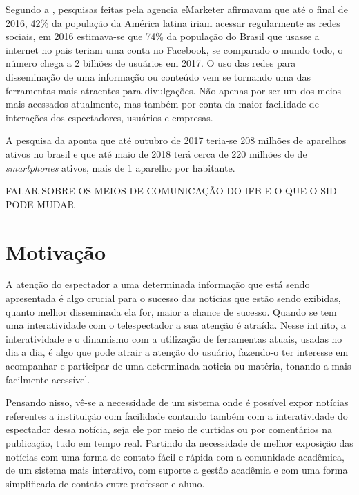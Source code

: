 
Segundo a \cite{forbes2016}, pesquisas feitas pela agencia eMarketer afirmavam que até o final de 2016, 42\% da população da América latina iriam acessar regularmente as redes sociais, em 2016 estimava-se que 74\% da população do Brasil que usasse a internet no pais teriam uma conta no Facebook, se comparado o mundo todo, o número chega a 2 bilhões de usuários em 2017. O uso das redes para disseminação de uma informação ou conteúdo vem se tornando uma das ferramentas mais atraentes para divulgações. Não apenas por ser um dos meios mais acessados atualmente, mas também por conta da maior facilidade de interações dos espectadores, usuários e empresas. 

A pesquisa da \cite{fgv2017} aponta que até outubro de 2017 teria-se 208 milhões de aparelhos ativos no brasil e que até maio de 2018 terá cerca de 220 milhões de de \textit{smartphones} ativos, mais de 1 aparelho por habitante. 


FALAR SOBRE OS MEIOS DE COMUNICAÇÃO DO IFB E O QUE O SID PODE MUDAR


\section{Motivação}
A atenção do espectador a uma determinada informação que está sendo apresentada é algo crucial para o sucesso das notícias que estão sendo exibidas, quanto melhor disseminada ela for, maior a chance de sucesso. Quando se tem uma interatividade com o telespectador a sua atenção é atraída. Nesse intuito, a interatividade e o dinamismo com a utilização de ferramentas atuais, usadas no dia a dia, é algo que pode atrair a atenção do usuário, fazendo-o ter interesse em acompanhar e participar de uma determinada noticia ou matéria, tonando-a mais facilmente acessível. 

Pensando nisso, vê-se a necessidade de um sistema onde é possível expor notícias referentes a instituição com facilidade contando também com a interatividade do espectador dessa notícia, seja ele por meio de curtidas ou por comentários na publicação, tudo em tempo real. Partindo da necessidade de melhor exposição das notícias com uma forma de contato fácil e rápida com a comunidade acadêmica, de um sistema mais interativo, com suporte a gestão acadêmia e com uma forma simplificada de contato entre professor e aluno. 

